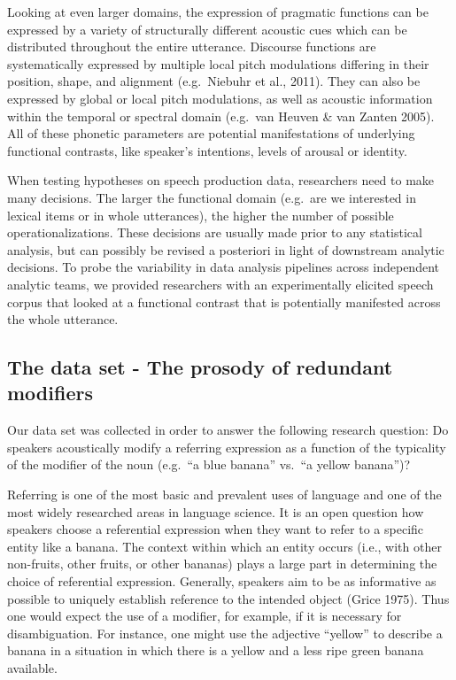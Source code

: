 \documentclass[
  english,
  man]{apa6}
\begin{document}
Looking at even larger domains, the expression of pragmatic functions can be expressed by a variety of structurally different acoustic cues which can be distributed throughout the entire utterance.
Discourse functions are systematically expressed by multiple local pitch modulations differing in their position, shape, and alignment (e.g.~Niebuhr et al., 2011).
They can also be expressed by global or local pitch modulations, as well as acoustic information within the temporal or spectral domain (e.g.~van Heuven \& van Zanten 2005).
All of these phonetic parameters are potential manifestations of underlying functional contrasts, like speaker's intentions, levels of arousal or identity.

When testing hypotheses on speech production data, researchers need to make many decisions.
The larger the functional domain (e.g.~are we interested in lexical items or in whole utterances), the higher the number of possible operationalizations.
These decisions are usually made prior to any statistical analysis, but can possibly be revised a posteriori in light of downstream analytic decisions.
To probe the variability in data analysis pipelines across independent analytic teams, we provided researchers with an experimentally elicited speech corpus that looked at a functional contrast that is potentially manifested across the whole utterance.

\hypertarget{the-data-set---the-prosody-of-redundant-modifiers}{%
\subsection{The data set - The prosody of redundant modifiers}\label{the-data-set---the-prosody-of-redundant-modifiers}}

Our data set was collected in order to answer the following research question: Do speakers acoustically modify a referring expression as a function of the typicality of the modifier of the noun (e.g.~\enquote{a blue banana} vs.~\enquote{a yellow banana})?

Referring is one of the most basic and prevalent uses of language and one of the most widely researched areas in language science.
It is an open question how speakers choose a referential expression when they want to refer to a specific entity like a banana.
The context within which an entity occurs (i.e., with other non-fruits, other fruits, or other bananas) plays a large part in determining the choice of referential expression.
Generally, speakers aim to be as informative as possible to uniquely establish reference to the intended object (Grice 1975).
Thus one would expect the use of a modifier, for example, if it is necessary for disambiguation.
For instance, one might use the adjective \enquote{yellow} to describe a banana in a situation in which there is a yellow and a less ripe green banana available.
\end{document}
